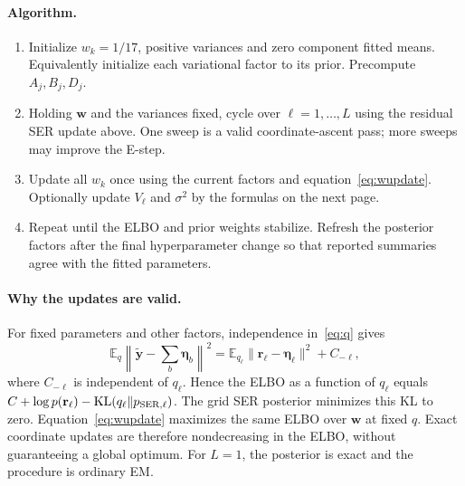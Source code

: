 \documentclass[11pt]{article}
\newcommand{\E}{\mathbb E}
\newcommand{\KL}{\operatorname{KL}}
\newcommand{\yb}{\widetilde{\mathbf y}}
\begin{document}
\paragraph{Algorithm.}
\begin{enumerate}
 \item Initialize $w_k=1/17$, positive variances and zero component
 fitted means. Equivalently initialize each variational factor to its
 prior. Precompute $A_j,B_j,D_j$.
 \item Holding $\mathbf w$ and the variances fixed, cycle over
 $\ell=1,\ldots,L$ using the residual SER update above. One sweep is
 a valid coordinate-ascent pass; more sweeps may improve the E-step.
 \item Update all $w_k$ once using the current factors and
 equation~\eqref{eq:wupdate}. Optionally update $V_\ell$ and $\sigma^2$
 by the formulas on the next page.
 \item Repeat until the ELBO and prior weights stabilize. Refresh the
 posterior factors after the final hyperparameter change so that
 reported summaries agree with the fitted parameters.
\end{enumerate}

\paragraph{Why the updates are valid.}
For fixed parameters and other factors, independence in~\eqref{eq:q}
gives
\begin{equation}
 \E_q\left\|\yb-\sum_b\boldsymbol\eta_b\right\|^2
 =\E_{q_\ell}\|\mathbf r_\ell-\boldsymbol\eta_\ell\|^2+C_{-\ell},
 \label{eq:residual-identity}
\end{equation}
where $C_{-\ell}$ is independent of $q_\ell$. Hence the ELBO as a function
of $q_\ell$ equals $C+\log p(\mathbf r_\ell)
-\KL(q_\ell\|p_{\rm SER,\ell})$. The grid SER posterior minimizes this
KL to zero. Equation~\eqref{eq:wupdate} maximizes the same ELBO over
$\mathbf w$ at fixed $q$. Exact coordinate updates are therefore
nondecreasing in the ELBO, without guaranteeing a global optimum.
For $L=1$, the posterior is exact and the procedure is ordinary EM.

\newpage
\end{document}
